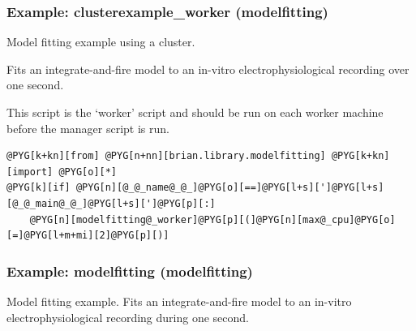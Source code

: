 \documentclass[letterpaper,10pt,english]{manual}
\begin{document}
\hypertarget{example-modelfitting-clusterexample-worker}{}\subsubsection{Example: clusterexample\_worker (modelfitting)}

Model fitting example using a cluster.

Fits an integrate-and-fire model to an in-vitro electrophysiological
recording over one second.

This script is the `worker' script and should be run on each worker machine
before the manager script is run.

\begin{Verbatim}[commandchars=@\[\]]
@PYG[k+kn][from] @PYG[n+nn][brian.library.modelfitting] @PYG[k+kn][import] @PYG[o][*]
@PYG[k][if] @PYG[n][@_@_name@_@_]@PYG[o][==]@PYG[l+s][']@PYG[l+s][@_@_main@_@_]@PYG[l+s][']@PYG[p][:]
    @PYG[n][modelfitting@_worker]@PYG[p][(]@PYG[n][max@_cpu]@PYG[o][=]@PYG[l+m+mi][2]@PYG[p][)]
\end{Verbatim}

\resetcurrentobjects
\hypertarget{--doc-examples-modelfitting_modelfitting}{}

\hypertarget{index-76}{}\subsubsection{Example: modelfitting (modelfitting)}

Model fitting example.
Fits an integrate-and-fire model to an in-vitro electrophysiological
recording during one second.
\end{document}
